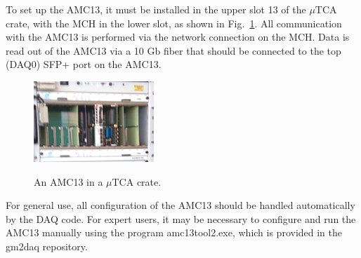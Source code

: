 To set up the AMC13, it must be installed in the upper slot 13 of the $\mu$TCA crate, with the MCH in the lower slot, as shown in Fig.~\ref{fig:amc13}. All communication with the AMC13 is performed via the network connection on the MCH. Data is read out of the AMC13 via a 10 Gb fiber that should be connected to the top (DAQ0) SFP+ port on the AMC13. 

\begin{figure}
\centering
\includegraphics{figs/amc13.png}
\label{fig:amc13}
\caption{An AMC13 in a $\mu$TCA crate.}
\end{figure}

For general use, all configuration of the AMC13 should be handled automatically by the DAQ code. For expert users, it may be necessary to configure and run the AMC13 manually using the program amc13tool2.exe, which is provided in the gm2daq repository. 